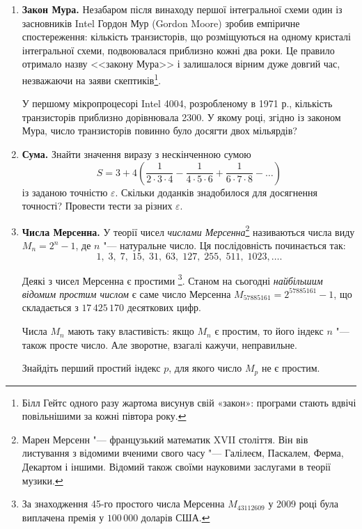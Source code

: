 \begin{enumerate}
\item \textbf{Закон Мура.} Незабаром після винаходу першої інтегральної схеми один із засновників Intel Гордон Мур (Gordon Moore) зробив емпіричне спостереження: кількість транзисторів, що розміщуються на одному кристалі інтегральної схеми, подвоювалася приблизно кожні два роки. Це правило отримало назву <<закону Мура>> і залишалося вірним дуже довгий час, незважаючи на заяви скептиків\footnote[1]{Білл Гейтс одного разу жартома висунув свій «закон»: програми стають вдвічі повільнішими за кожні півтора року.}.

У першому мікропроцесорі Intel 4004, розробленому в 1971 р., кількість транзисторів приблизно дорівнювала 2300. У якому році, згідно із законом Мура, число транзисторів повинно було досягти двох мільярдів?

\item \textbf{Сума.} Знайти значення виразу з нескінченною сумою
$$
S = 3+4\left(\frac{1}{2\cdot3\cdot4}-\frac{1}{4\cdot5\cdot6}+\frac{1}{6\cdot7\cdot8}-\ldots\right)
$$
із заданою точністю $\varepsilon$. Скільки доданків знадобилося для досягнення точності? Провести тести за різних $\varepsilon$.



\item \textbf{Числа Мерсенна.} У теорії чисел {\itshape числами Мерсенна}\footnote[3]{Марен Мерсенн "--- французький математик XVII століття. Він вів листування з відомими вченими свого часу "--- Галілеєм, Паскалем, Ферма, Декартом і іншими. Відомий також своїми науковими заслугами в теорії музики.} називаються числа виду $M_n=2^n-1$, де $n$ "--- натуральне число. Ця послідовність починається так:
$$
1,\; 3,\; 7,\; 15,\; 31,\; 63,\; 127,\; 255,\; 511,\; 1023,\ldots.
$$

Деякі з чисел Мерсенна є простими \footnote[4]{За знаходження 45-го простого числа Мерсенна $M_{43112609}$ у 2009 році була виплачена премія у $100\,000$ доларів США.}. Станом на сьогодні {\itshape найбільшим відомим простим числом} є саме число Мерсенна
$M_{57885161}=2^{57885161}-1$, що складається з $ 17 \, 425 \, 170 $ десяткових цифр.


Числа $M_n$ мають таку властивість: якщо $M_n$ є простим, то його індекс $n$ "--- також просте число. Але зворотне, взагалі кажучи, неправильне.

Знайдіть перший простий індекс $p$, для якого число $M_p$ не є простим.

\end{enumerate}



